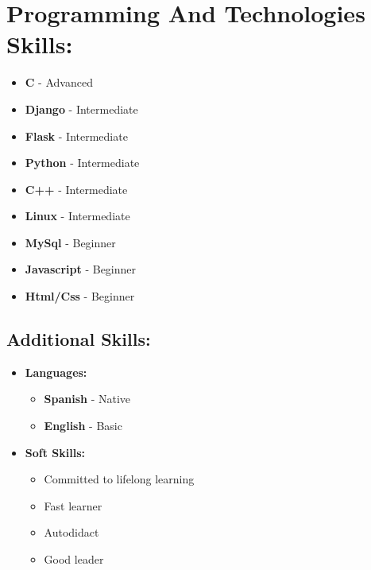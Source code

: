\documentclass{article}
\begin{document}
\begin{minipage}[t]{8cm}
\section*{Programming And Technologies Skills:}
\begin{itemize}
  \setlength\itemsep{0.01cm}
\item \textbf{C} - Advanced
\item \textbf{Django} - Intermediate  
\item \textbf{Flask} - Intermediate  
\item \textbf{Python} - Intermediate
\item \textbf{C++} - Intermediate
\item \textbf{Linux} - Intermediate
\item \textbf{MySql} - Beginner  
\item \textbf{Javascript} - Beginner 
\item \textbf{Html/Css} - Beginner
\end{itemize}

\subsection*{Additional Skills:}
\begin{itemize}
  \setlength\itemsep{0.01cm}
\item \textbf{Languages:}
  \begin{itemize}[label = {-}]
  \setlength\itemsep{0.01cm}
  \item \textbf{Spanish} - Native
  \item \textbf{English} - Basic 
  \end{itemize}
\item \textbf{Soft Skills:}
  \begin{itemize}[label = {-}]
  \setlength\itemsep{0.01cm}
  \item Committed to lifelong learning 
  \item Fast learner
  \item Autodidact
  \item Good leader
  \end{itemize}
\end{itemize}

\end{minipage}
\end{document}
